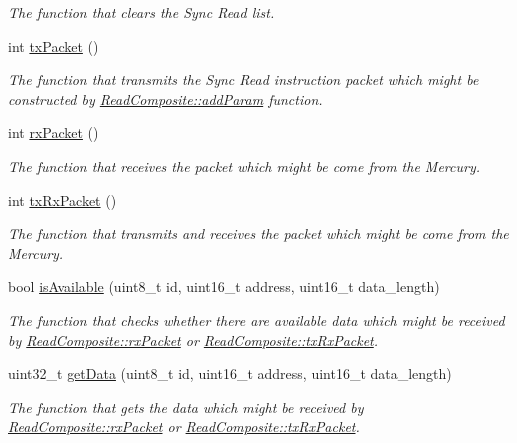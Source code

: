 \begin{DoxyCompactItemize}
\begin{DoxyCompactList}\small\item\em The function that clears the Sync Read list. \end{DoxyCompactList}\item 
int \hyperlink{classmercury_1_1_read_composite_abc70d94889c04b1e0a209bb905d4c5fe}{tx\+Packet} ()
\begin{DoxyCompactList}\small\item\em The function that transmits the Sync Read instruction packet which might be constructed by \hyperlink{classmercury_1_1_read_composite_af997f1fef18317302b0af5f76349d625}{Read\+Composite\+::add\+Param} function. \end{DoxyCompactList}\item 
int \hyperlink{classmercury_1_1_read_composite_ac90c5923cc92484c89c74ebed72d7945}{rx\+Packet} ()
\begin{DoxyCompactList}\small\item\em The function that receives the packet which might be come from the Mercury. \end{DoxyCompactList}\item 
int \hyperlink{classmercury_1_1_read_composite_a7814d278b7612cb3c27fa68f765621de}{tx\+Rx\+Packet} ()
\begin{DoxyCompactList}\small\item\em The function that transmits and receives the packet which might be come from the Mercury. \end{DoxyCompactList}\item 
bool \hyperlink{classmercury_1_1_read_composite_ac9a594b39a791de8e57a7860c8ad6e1b}{is\+Available} (uint8\+\_\+t id, uint16\+\_\+t address, uint16\+\_\+t data\+\_\+length)
\begin{DoxyCompactList}\small\item\em The function that checks whether there are available data which might be received by \hyperlink{classmercury_1_1_read_composite_ac90c5923cc92484c89c74ebed72d7945}{Read\+Composite\+::rx\+Packet} or \hyperlink{classmercury_1_1_read_composite_a7814d278b7612cb3c27fa68f765621de}{Read\+Composite\+::tx\+Rx\+Packet}. \end{DoxyCompactList}\item 
uint32\+\_\+t \hyperlink{classmercury_1_1_read_composite_aff256242809cfc9f78e70f3d8510873a}{get\+Data} (uint8\+\_\+t id, uint16\+\_\+t address, uint16\+\_\+t data\+\_\+length)
\begin{DoxyCompactList}\small\item\em The function that gets the data which might be received by \hyperlink{classmercury_1_1_read_composite_ac90c5923cc92484c89c74ebed72d7945}{Read\+Composite\+::rx\+Packet} or \hyperlink{classmercury_1_1_read_composite_a7814d278b7612cb3c27fa68f765621de}{Read\+Composite\+::tx\+Rx\+Packet}. \end{DoxyCompactList}\end{DoxyCompactItemize}


